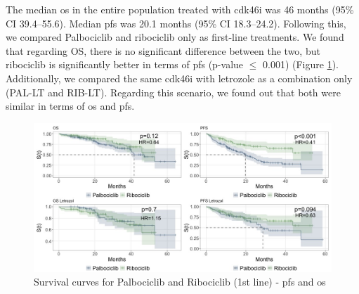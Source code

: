 The median \ac{os} in the entire population treated with \ac{cdk46i} was 46 months (95\% CI 39.4–55.6). Median \ac{pfs} was 20.1 months (95\% CI 18.3–24.2). Following this, we compared Palbociclib and ribociclib only as first-line treatments. We found that regarding OS, there is no significant difference between the two, but ribociclib is significantly better in terms of \ac{pfs} (p-value $\le$ 0.001) (Figure \ref*{fig:interest}). Additionally, we compared the same \ac{cdk46i} with letrozole as a combination only (PAL-LT and RIB-LT). Regarding this scenario, we found out that both were similar in terms of \ac{os} and \ac{pfs}.


\begin{figure}[ht]
  \caption{Survival curves for Palbociclib and Ribociclib (1st line) - \ac{pfs} and \ac{os}}\label{fig:interest} 
  \includegraphics[scale=0.45]{figures/interest_curve_both.jpeg}%

\end{figure}


